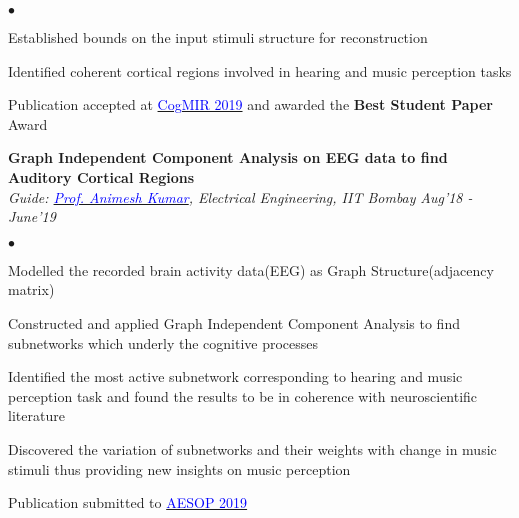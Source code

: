 \documentclass[margin,line, 9pt]{res}
\newenvironment{list2}{
  \begin{list}{$\bullet$}{%
      \setlength{\itemsep}{0.03in}
      \setlength{\parsep}{0in} \setlength{\parskip}{0in}
      \setlength{\topsep}{0in} \setlength{\partopsep}{0in} 
      \setlength{\leftmargin}{0.2in}}}{\end{list}}
\begin{document}
\begin{resume}
\begin{list2}
\item Established bounds on the input stimuli structure for reconstruction
\item Identified coherent cortical regions involved in hearing and music perception tasks
\item Publication accepted at \href{http://www.cogmir.org}{\textcolor{blue} {CogMIR 2019}} and awarded the \textbf{Best Student Paper} Award
\end{list2}
% 
% 
% 
% 
{\bf Graph Independent Component Analysis on EEG data to find Auditory Cortical Regions} \\
{\em Guide: \href{https://www.ee.iitb.ac.in/~animesh/}{\textcolor{blue}{Prof. Animesh Kumar}}, Electrical Engineering, IIT Bombay} \hfill {\it Aug'18 - June'19}\\
\vspace*{-.13in}
\begin{list2}
\item Modelled the recorded brain activity data(EEG) as Graph Structure(adjacency matrix)
\item Constructed and applied Graph Independent Component Analysis to find subnetworks which underly the cognitive processes
\item Identified the most active subnetwork corresponding to hearing and music perception task and found the results to be in coherence with neuroscientific literature
\item Discovered the variation of subnetworks and their weights with change in music stimuli thus providing new insights on music perception
\item Publication submitted to \href{https://gbiomed.kuleuven.be/english/research/50000666/50000672/Symposia/aesop/AESOP2019}{\textcolor{blue} {AESOP 2019}}
\end{list2}


\end{resume}
\end{document}
